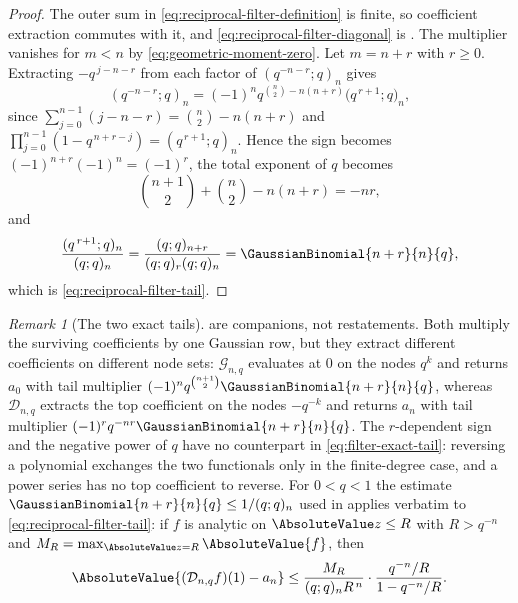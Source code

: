 \documentclass[11pt,a4paper,oneside,openany]{book}
\theoremstyle{definition}
\theoremstyle{remark}
\newtheorem{remark}[remark]{Remark}
\begin{document}
\begin{proof}
The outer sum in \eqref{eq:reciprocal-filter-definition} is finite, so coefficient extraction commutes with it, and \eqref{eq:reciprocal-filter-diagonal} is .  The multiplier vanishes for $m<n$ by \eqref{eq:geometric-moment-zero}.  Let $m=n+r$ with $r\ge0$.  Extracting $-q^{\,j-n-r}$ from each factor of $(q^{-n-r};q)_n$ gives
\[
 (q^{-n-r};q)_n
 =(-1)^nq^{\binom n2-n(n+r)}\bigl(q^{\,r+1};q\bigr)_n,
\]
since $\sum_{j=0}^{n-1}(j-n-r)=\binom n2-n(n+r)$ and $\prod_{j=0}^{n-1}(1-q^{\,n+r-j})=(q^{\,r+1};q)_n$.  Hence the sign becomes $(-1)^{n+r}(-1)^n=(-1)^r$, the total exponent of $q$ becomes
\[
 \binom{n+1}{2}+\binom n2-n(n+r)=-nr,
\]
and
\[
 \frac{(q^{\,r+1};q)_n}{(q;q)_n}
 =\frac{(q;q)_{n+r}}{(q;q)_r(q;q)_n}
 =\GaussianBinomial{n+r}{n}{q},
\]
which is \eqref{eq:reciprocal-filter-tail}.
\end{proof}

\begin{remark}[The two exact tails]\label{rem:two-exact-tails}
 are companions, not restatements.  Both multiply the surviving coefficients by one Gaussian row, but they extract different coefficients on different node sets: $\mathcal G_{n,q}$ evaluates at $0$ on the nodes $q^k$ and returns $a_0$ with tail multiplier $(-1)^nq^{\binom{n+1}{2}}\GaussianBinomial{n+r}{n}{q}$, whereas $\mathcal D_{n,q}$ extracts the top coefficient on the nodes $-q^{-k}$ and returns $a_n$ with tail multiplier $(-1)^rq^{-nr}\GaussianBinomial{n+r}{n}{q}$.  The $r$-dependent sign and the negative power of $q$ have no counterpart in \eqref{eq:filter-exact-tail}: reversing a polynomial exchanges the two functionals only in the finite-degree case, and a power series has no top coefficient to reverse.  For $0<q<1$ the estimate $\GaussianBinomial{n+r}{n}{q}\le1/(q;q)_n$ used in  applies verbatim to \eqref{eq:reciprocal-filter-tail}: if $f$ is analytic on $\AbsoluteValue z\le R$ with $R>q^{-n}$ and $M_R=\max_{\AbsoluteValue z=R}\AbsoluteValue{f}$, then
\[
 \AbsoluteValue{(\mathcal D_{n,q}f)(1)-a_n}
 \le\frac{M_R}{(q;q)_nR^{\,n}}\cdot
    \frac{q^{-n}/R}{1-q^{-n}/R}.
\]
\end{remark}
\end{document}
